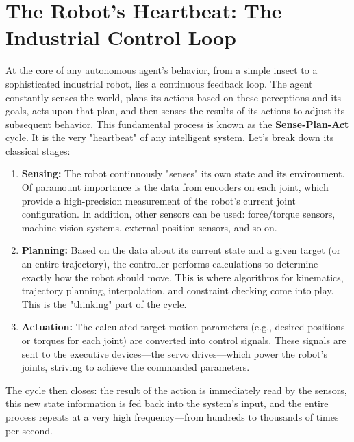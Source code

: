 
\section{The Robot's Heartbeat: The Industrial Control Loop}
\label{sec:control_loop}

At the core of any autonomous agent's behavior, from a simple insect to a sophisticated industrial robot, lies a continuous feedback loop. The agent constantly senses the world, plans its actions based on these perceptions and its goals, acts upon that plan, and then senses the results of its actions to adjust its subsequent behavior. This fundamental process is known as the \textbf{Sense-Plan-Act} cycle. It is the very "heartbeat" of any intelligent system. Let's break down its classical stages:

\begin{enumerate}
    \item \textbf{Sensing:} The robot continuously "senses" its own state and its environment. Of paramount importance is the data from encoders on each joint, which provide a high-precision measurement of the robot's current joint configuration. In addition, other sensors can be used: force/torque sensors, machine vision systems, external position sensors, and so on.
    
    \item \textbf{Planning:} Based on the data about its current state and a given target (or an entire trajectory), the controller performs calculations to determine exactly how the robot should move. This is where algorithms for kinematics, trajectory planning, interpolation, and constraint checking come into play. This is the "thinking" part of the cycle.
    
    \item \textbf{Actuation:} The calculated target motion parameters (e.g., desired positions or torques for each joint) are converted into control signals. These signals are sent to the executive devices—the servo drives—which power the robot's joints, striving to achieve the commanded parameters.
\end{enumerate}

The cycle then closes: the result of the action is immediately read by the sensors, this new state information is fed back into the system's input, and the entire process repeats at a very high frequency—from hundreds to thousands of times per second.

